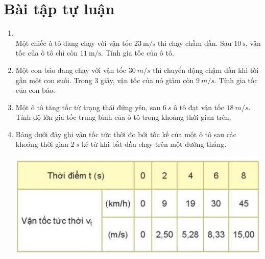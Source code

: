 \section{Bài tập tự luận}
\begin{enumerate}[label=\bfseries Bài \arabic*:,leftmargin=1.5cm]
	\item {}\\
	Một chiếc ô tô đang chạy với vận tốc $\SI{23}{\meter/\second}$ thì chạy chầm dần. Sau $\SI{10}{\second}$, vận tốc của ô tô chỉ còn $\SI{11}{\meter/\second}$. Tính gia tốc của ô tô.

\item {}

{
	
	Một con báo đang chạy với vận tốc $\SI{30}{m/s}$ thì chuyển động chậm dần khi tới gần một con suối. Trong 3 giây, vận tốc của nó giảm còn $\SI{9}{m/s}$. Tính gia tốc của con báo.
}

\item {}

{
	Một ô tô tăng tốc từ trạng thái đứng yên, sau $\SI{6}{s}$ ô tô đạt vận tốc $\SI{18}{m/s}$. Tính độ lớn gia tốc trung bình của ô tô trong khoảng thời gian trên.
}

\item {}

{
	Bảng dưới đây ghi vận tốc tức thời đo bởi tốc kế của một ô tô sau các khoảng thời gian $\SI{2}{s}$ kể từ khi bắt đầu chạy trên một đường thẳng.
	
	\begin{center}
		\includegraphics[scale=1]{../figs/VN10-2022-PH-TP007-1.jpg}
	\end{center}
	
}
\end{enumerate}
